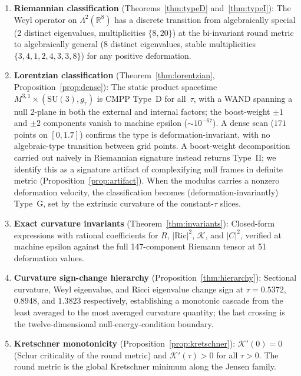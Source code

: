 \documentclass[12pt]{article}
\theoremstyle{definition}
\theoremstyle{remark}
\begin{document}
\begin{enumerate}
    \item \textbf{Riemannian classification} (Theorems~\ref{thm:typeD} and~\ref{thm:typeI}): The Weyl operator on $\Lambda^2(\mathbb{R}^8)$ has a discrete transition from algebraically special (2 distinct eigenvalues, multiplicities $\{8,20\}$) at the bi-invariant round metric to algebraically general (8 distinct eigenvalues, stable multiplicities $\{3,4,1,2,4,3,3,8\}$) for any positive deformation.

    \item \textbf{Lorentzian classification} (Theorem~\ref{thm:lorentzian}, Proposition~\ref{prop:dense}): The static product spacetime $M^{3,1}\times(\mathrm{SU}(3),g_\tau)$ is CMPP Type~D for all~$\tau$, with a WAND spanning a null 2-plane in both the external and internal factors; the boost-weight $\pm1$ and $\pm2$ components vanish to machine epsilon ($\sim10^{-67}$).  A dense scan ($171$ points on $[0,1.7]$) confirms the type is deformation-invariant, with no algebraic-type transition between grid points.  A boost-weight decomposition carried out naively in Riemannian signature instead returns Type~II; we identify this as a signature artifact of complexifying null frames in definite metric (Proposition~\ref{prop:artifact}).  When the modulus carries a nonzero deformation velocity, the classification becomes (deformation-invariantly) Type~G, set by the extrinsic curvature of the constant-$\tau$ slices.

    \item \textbf{Exact curvature invariants} (Theorem~\ref{thm:invariants}): Closed-form expressions with rational coefficients for $R$, $|\mathrm{Ric}|^2$, $\mathcal{K}$, and $|C|^2$, verified at machine epsilon against the full 147-component Riemann tensor at 51 deformation values.

    \item \textbf{Curvature sign-change hierarchy} (Proposition~\ref{thm:hierarchy}): Sectional curvature, Weyl eigenvalue, and Ricci eigenvalue change sign at $\tau=0.5372$, $0.8948$, and $1.3823$ respectively, establishing a monotonic cascade from the least averaged to the most averaged curvature quantity; the last crossing is the twelve-dimensional null-energy-condition boundary.

    \item \textbf{Kretschner monotonicity} (Proposition~\ref{prop:kretschner}): $\mathcal{K}'(0)=0$ (Schur criticality of the round metric) and $\mathcal{K}'(\tau)>0$ for all $\tau>0$.  The round metric is the global Kretschner minimum along the Jensen family.
\end{enumerate}
\end{document}
